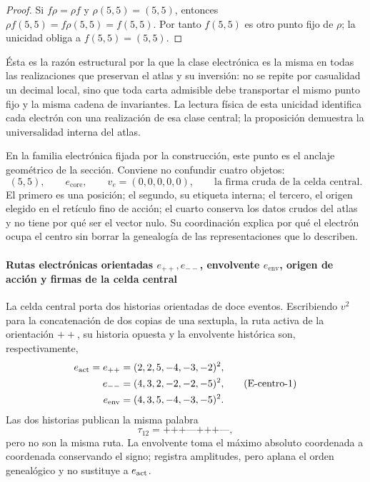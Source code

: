 \begin{proof}
Si \(f\rho=\rho f\) y \(\rho(5,5)=(5,5)\), entonces
\(\rho f(5,5)=f\rho(5,5)=f(5,5)\). Por tanto \(f(5,5)\) es otro punto fijo
de \(\rho\); la unicidad obliga a \(f(5,5)=(5,5)\).
\end{proof}

Ésta es la razón estructural por la que la clase electrónica es la misma en
todas las realizaciones que preservan el atlas y su inversión: no se repite
por casualidad un decimal local, sino que toda carta admisible debe
transportar el mismo punto fijo y la misma cadena de invariantes. La lectura
física de esta unicidad identifica cada electrón con una realización de esa
clase central; la proposición demuestra la universalidad interna del atlas.

En la familia electrónica fijada por la construcción, este punto es el anclaje
geométrico de la sección. Conviene no confundir cuatro objetos:
\[
 (5,5),\qquad
 e_{\mathrm{core}},\qquad
 v_e=(0,0,0,0,0),\qquad
 \text{la firma cruda de la celda central}.
\]
El primero es una posición; el segundo, su etiqueta interna; el tercero,
el origen elegido en el retículo fino de acción; el cuarto conserva los
datos crudos del atlas y no tiene por qué ser el vector nulo. Su
coordinación explica por qué el electrón ocupa el centro sin borrar la
genealogía de las representaciones que lo describen.

\paragraph{Rutas electrónicas orientadas \(e_{++},e_{--}\), envolvente \(e_{\mathrm{env}}\), origen de acción y firmas de la celda central}
La celda central porta dos historias orientadas de doce eventos. Escribiendo
\(v^2\) para la concatenación de dos copias de una sextupla, la ruta activa
de la orientación \({++}\), su historia opuesta y la envolvente histórica
son, respectivamente,
\[
\begin{aligned}
 e_{\rm act}=e_{++}
   &=(2,2,5,-4,-3,-2)^2,\\
 e_{--}
   &=(4,3,2,-2,-2,-5)^2,\\
 e_{\rm env}
   &=(4,3,5,-4,-3,-5)^2.
\end{aligned}
\tag{E-centro-1}\label{p12-83-c15-s2:eq:electron-rutas-finas-rev8}
\]
Las dos historias publican la misma palabra
\[
 \tau_{12}=\texttt{+++---+++---},
\]
pero no son la misma ruta. La envolvente toma el máximo absoluto
coordenada a coordenada conservando el signo; registra amplitudes, pero
aplana el orden genealógico y no sustituye a \(e_{\rm act}\).

